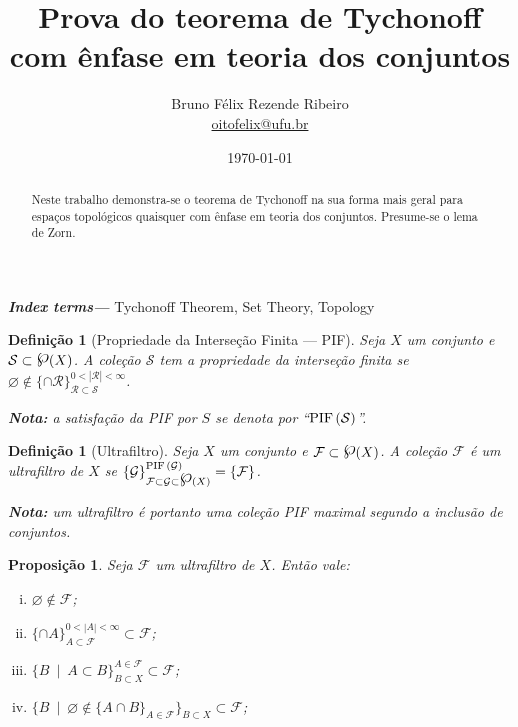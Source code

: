 \documentclass{article}
\title{Prova do teorema de Tychonoff com ênfase em teoria dos conjuntos}
\author{Bruno Félix Rezende Ribeiro \\ \href{mailto:oitofelix@ufu.br}{oitofelix@ufu.br}}
\affil{FAMAT ---  Universidade Federal de Uberlândia}
\date{\today}
\newtheorem{definition}[theorem]{Definição}
\newtheorem{proposition}[theorem]{Proposição}
\providecommand{\keywords}[1]{\textbf{\textit{Index terms---}} #1}
\newcommand{\powerset}{\raisebox{.15\baselineskip}{\Large\ensuremath{\wp}}}
\newcommand{\suchthat}{\enspace|\enspace}
\newcommand{\fip}[1]{\text{PIF\,}(#1)}
\begin{document}
\maketitle

\begin{abstract}
  Neste trabalho demonstra-se o teorema de Tychonoff na sua forma mais
  geral para espaços topológicos quaisquer com ênfase em teoria dos
  conjuntos.  Presume-se o lema de Zorn.
\end{abstract}

\keywords{Tychonoff Theorem, Set Theory, Topology}

\begin{definition}[Propriedade da Interseção Finita --- PIF]
  Seja \(X\) um conjunto e \(\mathcal{S} \subset \powerset(X)\).  A
  coleção \(\mathcal{S}\) tem a propriedade da interseção finita se
  \(\varnothing \notin \{\cap \mathcal{R}\}_{\mathcal{R} \subset
    \mathcal{S}}^{0 < |\mathcal{R}| < \infty}\).

  \vspace{0.5em}\noindent\textbf{Nota:} a satisfação da PIF por \(S\)
  se denota por ``\(\fip{\mathcal{S}}\)''.
\end{definition}

\begin{definition}[Ultrafiltro]
  Seja \(X\) um conjunto e \(\mathcal{F} \subset \powerset(X)\).  A
  coleção \(\mathcal{F}\) é um ultrafiltro de \(X\) se
  \(\{\mathcal{G}\}_{\mathcal{F}\subset
    \mathcal{G}\subset\powerset(X)}^{\fip{\mathcal{G}}}=\{\mathcal{F}\}\).

  \vspace{0.5em}\noindent\textbf{Nota:} um ultrafiltro é portanto uma
  coleção PIF maximal segundo a inclusão de conjuntos.
\end{definition}

\begin{proposition}\label{uf_prop}
  Seja \(\mathcal{F}\) um ultrafiltro de \(X\).  Então vale:
  \begin{enumerate}[(i)]
  \item \(\varnothing \notin \mathcal{F}\);
  \item \(\{\cap A\}_{A \subset \mathcal{F}}^{0 < |A|<\infty} \subset \mathcal{F}\);
  \item \(\{B \suchthat A \subset B\}_{B\subset X}^{A\in \mathcal{F}}
    \subset \mathcal{F}\);
  \item \(\{B \suchthat \varnothing \notin \{A \cap B\}_{A \in \mathcal{F}}
    \}_{B \subset X} \subset \mathcal{F}\);
  \end{enumerate}
\end{proposition}
\end{document}
